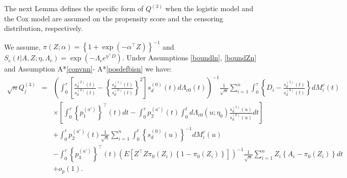 \documentclass[11pt]{article}
\newcommand{\eqnn}{\begin{eqnarray*}}
\newcommand{\een}{\end{eqnarray*}}
\begin{document}
The next Lemma defines the specific form of $Q^{(3)}$ when the logistic model and the Cox model are assumed on the propensity score and the censoring distribution, respectively.
\begin{lemmas}\label{ifQ4}
We assume, $\pi(Z ; \alpha)=\left\{1+\exp(-\alpha^\top Z)\right\}^{-1}$
and $S_c(t | A,Z; \eta, \Lambda_c)=\exp\left(-\Lambda_{c}e^{\eta^\top D}\right)$.
Under Assumptions \ref{boundln}, \ref{boundZn} and Assumption A*\ref{convnn}- A*\ref{posdefbisn} we have:
\eqnn
\sqrt{n}Q^{(3)}_j
&=& \left(\int_0^\tau\left[\frac{s_d^{(2)}(t)}{s_d^{(0)}(t)}-\left\{\frac{s_d^{(1)}(t)}{s_d^{(0)}(t)}\right\}^2\right]s_d^{(0)}(t)d\Lambda_{c0}(t)\right)^{-1}\frac{1}{\sqrt{n}}\sum_{i=1}^n\int_0^\tau \left\{D_i-\frac{s_d^{(1)}(t)}{s_d^{(0)}(t)}\right\}dM^c_i(t)
\\
&&\times\left[\int_0^\tau \left\{p^{(a')}_{1}\right\}^\top(t)dt-\int_0^\tau p^{(a')}_{2}(t)\int_0^t d\Lambda_{c0}(u; \eta_0)\frac{s_d^{(1)}(u)}{s_d^{(0)}(u)}dt\right]
\\
&& +\int_0^\tau p^{(a')}_{2}(t)\frac{1}{\sqrt{n}}\sum_{i=1}^n\int_0^t \left\{s_d^{(0)}(u)\right\}^{-1}dM^c_i(u)
\\
&&- \int_0^\tau\left\{p^{(a')}_{3}\right\}^\top(t) \left(E\left[Z^\top Z \pi_0(Z_i)\left\{1-\pi_0(Z_i)\right\}\right]\right)^{-1}\frac{1}{\sqrt{n}}\sum_{i=1}^n Z_i\left\{A_i-\pi_0(Z_i)\right\}dt
\\&&+o_p(1).\een
\end{lemmas}
\end{document}
